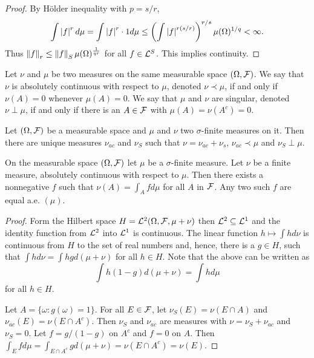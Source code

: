 \begin{proof}
By Hölder inequality with $p=s/r$,
\begin{equation*}
\int\left\lvert f\right\rvert^rd\mu=\int \left\lvert f\right\rvert^r\cdot 1d\mu \leq \left(\int\left\lvert f\right\rvert^{r(s/r)}\right)^{r/s}\mu(\Omega)^{1/q}<\infty.
\end{equation*}
Thus $\left\lVert f\right\rVert_r\leq\left\lVert f\right\rVert_S\mu(\Omega)^{\frac{1}{qr}}$ for all $f\in \mathcal L^S$. This implies continuity.
\end{proof}




\begin{definition}
Let $\nu$ and $\mu$ be two measures on the same measurable space $(\Omega, \mathcal F)$. We say that $\nu$ is absolutely continuous with respect to $\mu$, denoted $\nu \prec \mu$, if and only if $\nu(A)=0$ whenever $\mu(A)=0$. We say that $\mu$ and $\nu$ are singular, denoted $\nu\perp\mu$, if and only if there is an $A\in\mathcal F$ with $\mu(A)=\nu(A^c)=0$.
\end{definition}






\begin{theorem}
Let $(\Omega, \mathcal F)$ be a measurable space and $\mu$ and $\nu$ two $\sigma$-finite measures on it. Then there are unique measures $\nu_{ac}$ and $\nu_S$ such that $\nu=\nu_{ac}+\nu_{s}$, $\nu_{ac}\prec\mu$ and $\nu_{S}\perp\mu$.
\end{theorem}



\begin{theorem}
On the measurable space $(\Omega, \mathcal F)$ let $\mu$ be a $\sigma$-finite measure. Let $\nu$ be a finite measure, absolutely continuous with respect to $\mu$. Then there exists a nonnegative $f$ such that $\nu(A)=\int_A fd\mu$ for all $A$ in $\mathcal F$. Any two such $f$ are equal a.e. $(\mu)$.
\end{theorem}




\begin{proof}
Form the Hilbert space $H=\mathcal L^2(\Omega, \mathcal F, \mu+\nu)$ then $\mathcal L^2\subseteq\mathcal L^1$ and the identity function from $\mathcal L^2$ into $\mathcal L^1$ is continuous. The linear function $h\mapsto \int hd\nu$ is continuous from $H$ to the set of real numbers and, hence, there is a $g\in H$, such that $\int hd\nu=\int hgd(\mu+\nu)$ for all $h\in H$. Note that the above can be written as
\begin{equation*}
\int h(1-g)d(\mu+\nu)=\int hd\mu
\end{equation*}
for all $h\in H$.

Let $A=\{\omega: g(\omega)=1 \}$. For all $E\in\mathcal F$, let $\nu_S(E)=\nu(E\cap A)$ and $\nu_{ac}(E)=\nu(E\cap A^c)$. Then $\nu_S$ and $\nu_{ac}$ are measures with $\nu=\nu_S+\nu_{ac}$ and $\nu_S=0$. Let $f=g/(1-g)$ on $A^c$ and $f=0$ on $A$. Then $\int_E f d\mu=\int_{E\cap A^c} gd(\mu+\nu)=\nu(E\cap A^c)=\nu(E)$.
\end{proof}